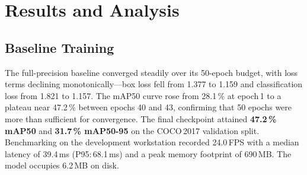 \documentclass[conference]{IEEEtran}
\begin{document}
\begin{table}[htbp]
\caption{Training Phase Configurations}
\label{tab:training_summary}
\begin{center}
\end{center}
\end{table}


\section{Results and Analysis}

\subsection{Baseline Training}

The full-precision baseline converged steadily over its 50-epoch budget, with loss terms declining monotonically---box loss fell from 1.377 to 1.159 and classification loss from 1.821 to 1.157. The mAP50 curve rose from 28.1\,\% at epoch\,1 to a plateau near 47.2\,\% between epochs 40 and 43, confirming that 50 epochs were more than sufficient for convergence. The final checkpoint attained \textbf{47.2\,\% mAP50} and \textbf{31.7\,\% mAP50-95} on the COCO\,2017 validation split. Benchmarking on the development workstation recorded 24.0\,FPS with a median latency of 39.4\,ms (P95:\,68.1\,ms) and a peak memory footprint of 690\,MB. The model occupies 6.2\,MB on disk.
\end{document}
